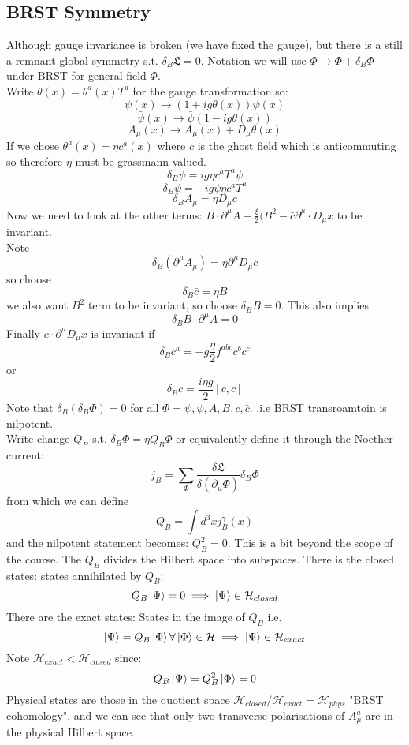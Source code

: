 \documentclass{article}
\begin{document}
       \subsection{BRST Symmetry}
       Although gauge invariance is broken (we have fixed the gauge), but there is a still a remnant global symmetry s.t. $\delta_B \mathfrak{L} = 0$. Notation we will use $\Phi \rightarrow \Phi + \delta_{B} \Phi$ under BRST for general field $\Phi$.\\
       Write $\theta(x) =\theta^a(x) T^a$ for the gauge transformation so:
       $$
        \psi(x) \rightarrow ( 1 + i g \theta (x)) \psi(x)
       $$
       $$
       \bar \psi(x) \rightarrow \bar \psi( 1 - i g \theta(x))
       $$
       $$
       A_{\mu} (x) \rightarrow A_{\mu}(x) + D_{\mu} \theta(x)
       $$
       If we chose $\theta^a(x) = \eta c^a(x)$ where $c$ is the ghost field which is anticommuting so therefore $\eta$ must be grassmann-valued.
       $$
        \delta_B \psi = i g \eta c^a T^a \psi
       $$
       $$
        \delta_B \bar \psi = - i g \bar \psi \eta c^a T^a
       $$
       $$
        \delta_B A_{\mu} = \eta D_{\mu} c
       $$
       Now we need to look at the other terms: $B \cdot \partial^{\mu} A - \frac{\xi}{2} ( B^2 - \bar c \partial^{\mu}\cdot D_{\mu} x$ to be invariant.\\
       Note 
       $$
        \delta_B( \partial^{\mu} A_{\mu}) = \eta \partial^{\mu} D_{\mu} c
       $$
       so choose
       $$
        \delta_B \bar c = \eta B
       $$
       we also want $B^2$ term to be invariant, so choose $\delta_B B = 0$. This also implies
       $$
        \delta_B B \cdot \partial^{\mu} A = 0
       $$
       Finally $\bar c \cdot \partial^{\mu} D_{\mu} x $ is invariant if
       $$
        \delta_B c^a = - g \frac{\eta}{2} f^{abc} c^b c^c
       $$
       or 
       $$
        \delta_B c= \frac{i \eta g}{2} [ c,c]
       $$
       Note that $\delta_B( \delta_B \Phi) = 0$ for all $\Phi= \psi, \bar \psi, A, B, c, \bar c$. .i.e BRST transroamtoin is nilpotent.\\
       Write change $Q_B$ s.t. $\delta_B \Phi = \eta Q_B \Phi$ or equivalently define it through the Noether current:
       $$
        j_B = \sum_{\Phi} \frac{\delta \mathfrak{L}}{\delta( \partial_{\mu} \Phi)} \delta_B \Phi
       $$
       from which we can define
       $$
        Q_B = \int d^3 x j^{\gamma}_B (x) 
       $$
       and the nilpotent statement becomes: $Q_B^2 = 0$. This is a bit beyond the scope of the course. The $Q_B$ divides the Hilbert space into subspaces. There is the closed states: states annihilated by $Q_B$:
       $$
       Q_B \ket{\Psi} = 0 \implies \ket{\Psi} \in \mathcal{H}_{closed}
       $$
       There are the exact states: States in the image of $Q_B$ i.e.
$$
\ket{\Psi} = Q_B \ket{\Phi} \forall \ket{\Phi} \in \mathcal{H} \implies \ket{\Psi} \in \mathcal{H}_{exact}
$$
Note $\mathcal{H}_{exact} < \mathcal{H}_{closed}$ since:
$$
Q_B \ket{\Psi} = Q_B^2 \ket{\Phi} = 0
$$
Physical states are those in the quotient space $\mathcal{H}_{closed}/ \mathcal{H}_{exact} = \mathcal{H}_{phys}$ "BRST cohomology", and we can see that only two transverse polarisations of $A_{\mu}^a$ are in the physical Hilbert space.
\end{document}
